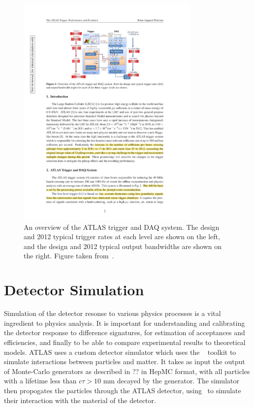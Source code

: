 \begin{figure}[h]
\centering
\includegraphics[width=0.8\textwidth]{trigger_overview}
\caption{An overview of the ATLAS trigger and DAQ system. The design and 2012
typical trigger rates at each level are shown on the left, and the design and
2012 typical output bandwidths are shown on the right. Figure taken
from~\cite{Petersen:1491585}.}
\label{fig:trigger_overview}
\end{figure}

\section{Detector Simulation}

Simulation of the detector resonse to various physics processes is a vital
ingredient to physics analysis. It is important for understanding and
calibrating the detector response to difference signatures, for estimation of
acceptances and efficiencies, and finally to be able to compare experimental
results to theoretical models. ATLAS uses a custom detector simulator which uses
the
\geant~\cite{Agostinelli2003250} toolkit to simulate interactions between
particles and matter. It takes as input the output of Monte-Carlo generators as described
in ?? in HepMC format, with all particles with a lifetime less than $c \tau >
10$ mm decayed by the generator. The simulator then propogates the particles
through the ATLAS detector, using \geant\ to simulate their interaction with the
material of the detector. 

